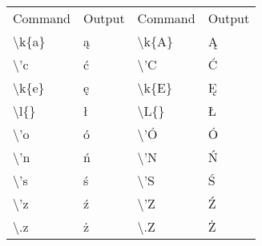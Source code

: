 \documentclass[a4paper,11pt]{article}
\begin{document}
\begin{tabular}{|ll|ll|}\hline
Command & Output & Command & Output \\
\textbackslash k\{a\} & ą & \textbackslash k\{A\} & Ą \\
\textbackslash {'}c & ć & \textbackslash {'}C & Ć \\ 
\textbackslash k\{e\} & ę & \textbackslash k\{E\} & Ę \\ 
\textbackslash l\{\} & ł & \textbackslash L\{\} & Ł \\ 
\textbackslash {'}o & ó & \textbackslash {'}Ó & Ó \\ 
\textbackslash {'}n & ń & \textbackslash {'}N & Ń \\ 
\textbackslash {'}s & ś & \textbackslash {'}S & Ś \\ 
\textbackslash {'}z & ź & \textbackslash {'}Z & Ź \\ 
\textbackslash .z & ż & \textbackslash .Z & Ż \\ \hline
\end{tabular}
\end{document}
